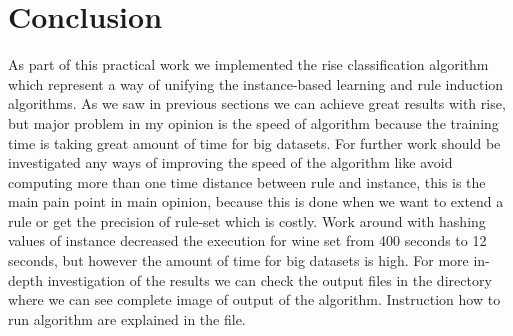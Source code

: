 \documentclass{article}
\begin{document}
\section{Conclusion}
As part of this practical work we implemented the rise classification algorithm which represent a way of unifying the 
instance-based learning and rule induction algorithms. As we saw in previous sections we can achieve great results
with rise, but major problem in my opinion is the speed of algorithm because the training time is taking great amount of time
for big datasets. For further work should be investigated any ways of improving the speed of the algorithm like
avoid computing more than one time distance between rule and instance, this is the main pain point in main opinion, because
this is done when we want to extend a rule or get the precision of rule-set which is costly. Work around with hashing
values of instance decreased the execution for wine set from 400 seconds to 12 seconds, but however the amount of time for
big datasets is high. For more in-depth investigation of the results we can check the output files in the  directory
where we can see complete image of output of the algorithm. 
Instruction how to run algorithm are explained in the  file.

\newpage

\end{document}
